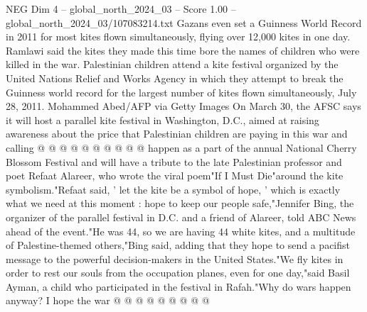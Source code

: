 \begin{textsample}{NEG Dim 4 – global\_north\_2024\_03 – Score 1.00 – global\_north\_2024\_03/107083214.txt}
Gazans even set a Guinness World Record in 2011 for most kites flown simultaneously, flying over 12,000 kites in one day.
Ramlawi said the kites they made this time bore the names of children who were killed in the war.
Palestinian children attend a kite festival organized by the United Nations Relief and Works Agency in which they attempt to break the Guinness world record for the largest number of kites flown simultaneously, July 28, 2011.
Mohammed Abed/AFP via Getty Images On March 30, the AFSC says it will host a parallel kite festival in Washington, D.C., aimed at raising awareness about the price that Palestinian children are paying in this war and calling @ @ @ @ @ @ @ @ @ @ happen as a part of the annual National Cherry Blossom Festival and will have a tribute to the late Palestinian professor and poet Refaat Alareer, who wrote the viral poem"If I Must Die"around the kite symbolism."Refaat said, ' let the kite be a symbol of hope, ' which is exactly what we need at this moment : hope to keep our people safe,"Jennifer Bing, the organizer of the parallel festival in D.C. and a friend of Alareer, told ABC News ahead of the event."He was 44, so we are having 44 white kites, and a multitude of Palestine-themed others,"Bing said, adding that they hope to send a pacifist message to the powerful decision-makers in the United States."We fly kites in order to rest our souls from the occupation planes, even for one day,"said Basil Ayman, a child who participated in the festival in Rafah."Why do wars happen anyway?
I hope the war @ @ @ @ @ @ @ @ @

\end{textsample}
